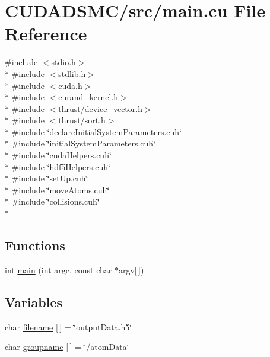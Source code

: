 \hypertarget{main_8cu}{\section{C\+U\+D\+A\+D\+S\+M\+C/src/main.cu File Reference}
\label{main_8cu}
}
{\ttfamily \#include $<$stdio.\+h$>$}\\*
{\ttfamily \#include $<$stdlib.\+h$>$}\\*
{\ttfamily \#include $<$cuda.\+h$>$}\\*
{\ttfamily \#include $<$curand\+\_\+kernel.\+h$>$}\\*
{\ttfamily \#include $<$thrust/device\+\_\+vector.\+h$>$}\\*
{\ttfamily \#include $<$thrust/sort.\+h$>$}\\*
{\ttfamily \#include \char`\"{}declare\+Initial\+System\+Parameters.\+cuh\char`\"{}}\\*
{\ttfamily \#include \char`\"{}initial\+System\+Parameters.\+cuh\char`\"{}}\\*
{\ttfamily \#include \char`\"{}cuda\+Helpers.\+cuh\char`\"{}}\\*
{\ttfamily \#include \char`\"{}hdf5\+Helpers.\+cuh\char`\"{}}\\*
{\ttfamily \#include \char`\"{}set\+Up.\+cuh\char`\"{}}\\*
{\ttfamily \#include \char`\"{}move\+Atoms.\+cuh\char`\"{}}\\*
{\ttfamily \#include \char`\"{}collisions.\+cuh\char`\"{}}\\*
\subsection*{Functions}
\begin{DoxyCompactItemize}
\item 
int \hyperlink{main_8cu_ac0f2228420376f4db7e1274f2b41667c}{main} (int argc, const char $\ast$argv\mbox{[}$\,$\mbox{]})
\end{DoxyCompactItemize}
\subsection*{Variables}
\begin{DoxyCompactItemize}
\item 
char \hyperlink{main_8cu_a6c2affe0788e6ba12dce7a51e1bd35c3}{filename} \mbox{[}$\,$\mbox{]} = \char`\"{}output\+Data.\+h5\char`\"{}
\item 
char \hyperlink{main_8cu_a8fed0c6a45def4b6cfc33b6c2d6b529a}{groupname} \mbox{[}$\,$\mbox{]} = \char`\"{}/atom\+Data\char`\"{}
\end{DoxyCompactItemize}


